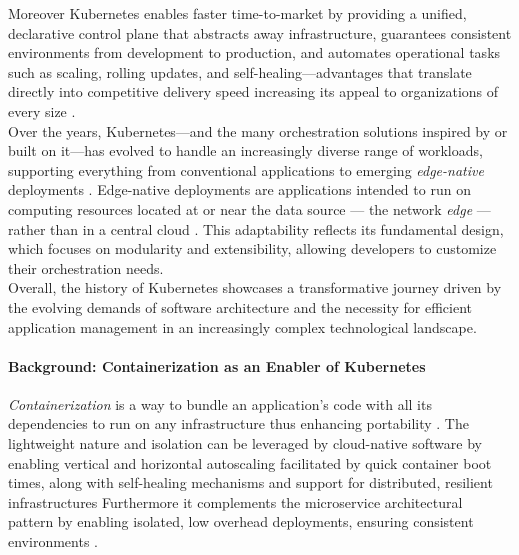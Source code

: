 \documentclass[11pt, a4paper, oneside, draft]{scrartcl}
\begin{document}
                Moreover Kubernetes enables faster time-to-market by providing a unified,
                declarative control plane that abstracts away infrastructure,
                guarantees consistent environments from development to production,
                and automates operational tasks such as scaling, rolling updates,
                and self-healing—advantages that translate directly into competitive delivery speed
                increasing its appeal to organizations of every size
                \parencite[pp.~858--859]{damarapati2025}.
                \\
                Over the years, Kubernetes—and the many orchestration solutions inspired by or built
                on it—has evolved to handle an increasingly diverse range of workloads,
                supporting everything from conventional applications to emerging
                \textit{edge-native} deployments \parencites[p.~21]{biot2025}[pp.~1--4]{biot2025}.
                Edge-native deployments are applications intended to run on computing
                resources located at or near the data source --- the network \textit{edge} ---
                rather than in a central cloud \parencite[p.~34]{satyanarayanan2019}.
                This adaptability reflects its fundamental design, which focuses on modularity and
                extensibility, allowing developers to customize their orchestration needs.
                \\
                Overall, the history of Kubernetes showcases a transformative journey driven by the
                evolving demands of software architecture and the necessity for efficient
                application management in an increasingly complex technological landscape.

            \paragraph{Background: Containerization as an Enabler of Kubernetes}
                \textit{Containerization} is a way to bundle an application's code with all its
                dependencies to run on any infrastructure thus enhancing portability
                \parencite{awsWhatIsContainerization,dockerWhatContainer}.
                The lightweight nature and isolation can be leveraged by cloud-native software by
                enabling vertical and horizontal autoscaling facilitated by quick container boot
                times, along with self-healing mechanisms and support for distributed, resilient
                infrastructures \parencites{kubernetesAutoscalingWorkloads}{kubernetesSelfHealing}
                    {awsWhatIsContainerization}[pp.~58--59]{davis2019}
                Furthermore it complements the microservice architectural pattern by enabling
                isolated, low overhead deployments, ensuring consistent environments
                \parencite[p.~209]{balalaie2016}.
\end{document}
